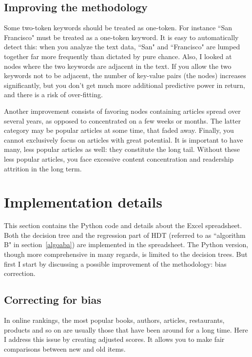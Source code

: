 \documentclass[oneside,10pt]{book}
\begin{document}
\subsection{Improving the methodology}\label{ccvcx}

Some two-token keywords should be treated as one-token. For instance ``San Francisco" must be treated as a one-token keyword. It is easy to automatically detect this: when you analyze the text data, ``San" and ``Francisco" are lumped together far more frequently than dictated by pure chance.
Also, I looked at nodes  where the two keywords are adjacent in the text. If you allow the two keywords not to be adjacent, the number of key-value pairs (the nodes) increases significantly, but you don't get much more additional predictive power in return, and there is a risk of over-fitting.


Another improvement consists of favoring nodes containing articles spread over several years, as opposed to concentrated on a few weeks or months. The latter category may be popular articles at some time, that faded away.
Finally, you cannot exclusively focus on articles with great potential. It is important to have many, less popular articles as well: they constitute the long tail. Without these less popular articles, you face excessive content concentration and readership attrition in the long term.

\section{Implementation details}

This section contains the Python code and details about the Excel spreadsheet. Both the decision tree and the regression part of HDT (referred to as ``algorithm B" in section~\ref{algoaba}) are implemented in the spreadsheet. The Python version, though more comprehensive in many regards, is limited to the decision trees. But first
I start by discussing a possible improvement of the methodology: bias correction.

\subsection{Correcting for bias}\label{timeab}

In online rankings, the most popular books, authors, articles, restaurants, products and so on are usually those that have been around for a long time.
Here I address this issue by creating adjusted scores. It allows you to make fair comparisons between new and old items.
\end{document}
